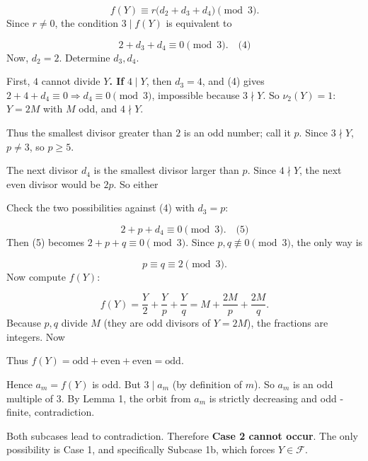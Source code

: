 \[
f(Y)\equiv r\bigl(d_2+d_3+d_4\bigr)\pmod3.
\]
Since \(r\neq0\), the condition \(3\mid f(Y)\) is equivalent to\par
\[
2+d_3+d_4\equiv0\pmod3. \quad\text{(4)}
\]
Now, \(d_2=2\). Determine \(d_3,d_4\).\par
First, \textbf{}\(4\) cannot divide \(Y\)\textbf{. If }\(4\mid Y\), then \(d_3=4\), and (4) gives \(2+4+d_4\equiv0\Rightarrow d_4\equiv0\pmod3\), impossible because \(3\nmid Y\). So \(\nu_2(Y)=1\): \(Y=2M\) with \(M\) odd, and \(4\nmid Y\).\par
Thus the smallest divisor greater than \(2\) is an odd number; call it \(p\). Since \(3\nmid Y\), \(p\neq3\), so \(p\ge5\).\par
The next divisor \(d_4\) is the smallest divisor larger than \(p\). Since \(4\nmid Y\), the next even divisor would be \(2p\). So either\par
{}
Check the two possibilities against (4) with \(d_3=p\):\par
\[
2+p+d_4\equiv0\pmod3. \quad\text{(5)}
\]
Then (5) becomes \(2+p+q\equiv0\pmod3\). Since \(p,q\not\equiv0\pmod3\), the only way is\par
\[
p\equiv q\equiv2\pmod3.
\]
Now compute \(f(Y)\):\par
\[
f(Y)=\frac{Y}{2}+\frac{Y}{p}+\frac{Y}{q}=M+\frac{2M}{p}+\frac{2M}{q}.
\]
Because \(p,q\) divide \(M\) (they are odd divisors of \(Y=2M\)), the fractions are integers. Now\par
{}
Thus \(f(Y)=\text{odd}+\text{even}+\text{even}=\text{odd}\).\par
Hence \(a_m=f(Y)\) is odd. But \(3\mid a_m\) (by definition of \(m\)). So \(a_m\) is an odd multiple of \(3\). By Lemma 1, the orbit from \(a_m\) is strictly decreasing and odd - finite, contradiction.\par
Both subcases lead to contradiction. Therefore \textbf{Case 2 cannot occur}. The only possibility is Case 1, and specifically Subcase 1b, which forces \(Y\in\mathcal{F}\).\par
\smallskip
{}
